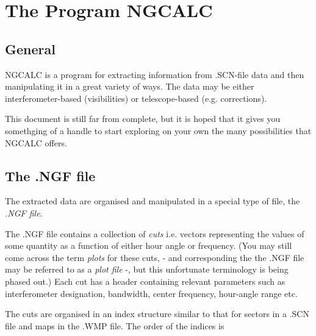 % 
% 
\newcommand{\noi}{\noindent} 
\newcommand{\bi}{\begin{itemize}} 
\newcommand{\ei}{\end{itemize}} 

\chapter{The Program NGCALC} 
\tableofcontents 


\section{ General} 
\label{.general} 

        NGCALC is a program for extracting information from .SCN-file data and
then manipulating it in a great variety of ways. The data may be either
interferometer-based (visibilities) or telescope-based (e.g. corrections).

        This document is still far from complete, but it is hoped that it gives
you somethging of a handle to start exploring on your own the many
possibilities that NGCALC offers.


\section{ The .NGF file} 
\label{.ngf.file} 

        The extracted data are organised and manipulated in a special type of
file, the {\em .NGF file}. 

        The .NGF file contains a collection of {\em cuts} i.e. vectors
representing the values of some quantity as a function of either hour angle or
frequency. (You may still come across the term {\em plots} for these cuts, -
and corresponding the the .NGF file may be referred to as a {\em plot file} -,
but this unfortunate terminology is being phased out.) Each cut has a header
containing relevant parameters such as interferometer designation, bandwidth,
center frequency, hour-angle range etc.  

        The cuts are organised in an index structure similar to that for
sectors in a .SCN file and maps in the .WMP file. The order of the indices is 


